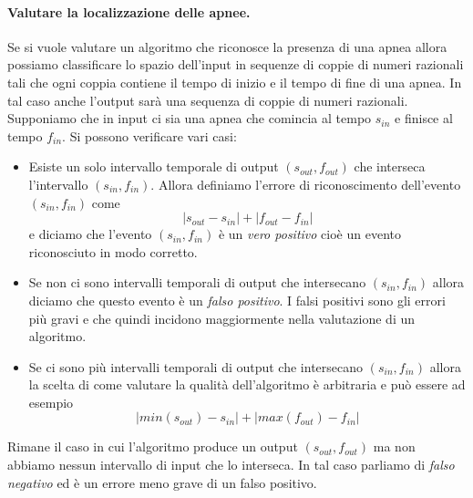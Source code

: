 \paragraph{Valutare la localizzazione delle apnee.}
Se si vuole valutare un algoritmo che riconosce la presenza di una apnea allora possiamo classificare lo spazio dell'input in sequenze di coppie di numeri razionali tali che ogni coppia contiene il tempo di inizio e il tempo di fine di una apnea. In tal caso anche l'output sar\`a una sequenza di coppie di numeri razionali. 
Supponiamo che in input ci sia una apnea che comincia al tempo $s_{in}$ e finisce al tempo $f_{in}$. Si possono verificare vari casi:
\begin{itemize}
  \item
    Esiste un solo intervallo temporale di output $(s_{out}, f_{out})$ che interseca l'intervallo $(s_{in}, f_{in})$. Allora definiamo l'errore di riconoscimento dell'evento $(s_{in}, f_{in})$ come 
    \[
      |s_{out}-s_{in}| + |f_{out}-f_{in}|
    \]
    e diciamo che l'evento $(s_{in}, f_{in})$ \`e un \emph{vero positivo} cio\`e un evento riconosciuto in modo corretto.
  \item
    Se non ci sono intervalli temporali di output che intersecano $(s_{in}, f_{in})$ allora diciamo che questo evento \`e un \emph{falso positivo}. I falsi positivi sono gli errori pi\`u gravi e che quindi incidono maggiormente nella valutazione di un algoritmo.
  \item
    Se ci sono pi\`u intervalli temporali di output che intersecano $(s_{in}, f_{in})$ allora la scelta di come valutare la qualit\`a dell'algoritmo \`e arbitraria e pu\`o essere ad esempio 
    \[
      |min(s_{out})-s_{in}| + |max(f_{out})-f_{in}|
    \]
\end{itemize}
Rimane il caso in cui l'algoritmo produce un output $(s_{out}, f_{out})$ ma non abbiamo nessun intervallo di input che lo interseca. 
In tal caso parliamo di \emph{falso negativo} ed \`e un errore meno grave di un falso positivo. 

